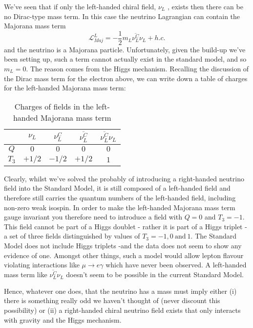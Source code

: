 We've seen that if only the left-handed chiral field, \(\nu _L\) , exists then there can be no Dirac-type mass term. In this case the neutrino Lagrangian can contain the Majorana mass term
\begin{equation}
    \mathcal{L}^L _{Maj} = - \frac{1}{2}m_L \overline{\nu _L ^C} \nu _L + h.c.
\end{equation}
and the neutrino is a Majorana particle. Unfortunately, given the build-up we've been setting up, such a term cannot actually exist in the standard model, and so \(m_L = 0\). The reason comes from the Higgs mechanism. Recalling the discussion of the Dirac mass term for the electron above, we can write down a table of charges for the left-handed Majorana mass term:
\begin{table}[!h]
    \centering
    \begin{tabular}{|c|c|c|c|c|}\hline
    & $\nu_L$ & $\nu_L ^C$ & $\overline{\nu_L ^C}$ & $\overline{\nu_L ^C}{\nu}_L$\\\hline
    $Q$ & $0$ & $0$ & $0$ & $0$\\
    $T_3$ & $+1/2$ & $-1/2$ & $+1/2$ & $1$  \\\hline
    \end{tabular}
    \caption{Charges of fields in the left-handed Majorana mass term}
    \label{tab:majorana_charges_sm}
\end{table}
Clearly, whilst we've solved the probably of introducing a right-handed neutrino field into the Standard Model, it is still composed of a left-handed field and therefore still carries the quantum numbers of the left-handed field, including non-zero weak isospin. In order to make the left-handed Majorana mass term gauge invariant you therefore need to introduce a field with $Q = 0$ and $T_3 = -1$. This field cannot be part of a Higgs doublet - rather it is part of a Higgs triplet - a set of three fields distinguished by values of $T_3 = -1, 0 ~\text{and}~ 1$. The Standard Model does not include Higgs triplets -and the data does not seem to show any evidence of one. Amongst other things, such a model would allow lepton flavour violating interactions like \(\mu \to e\gamma\) which have never been observed. A left-handed mass term like \(\overline{\nu _L ^C} \nu _L\) doesn’t seem to be possible in the current Standard Model.

Hence, whatever one does, that the neutrino has a mass must imply either (i) there is something really odd we haven’t thought of (never discount this possibility) or (ii) a right-handed chiral neutrino field exists that only interacts with gravity and the Higgs mechanism.

